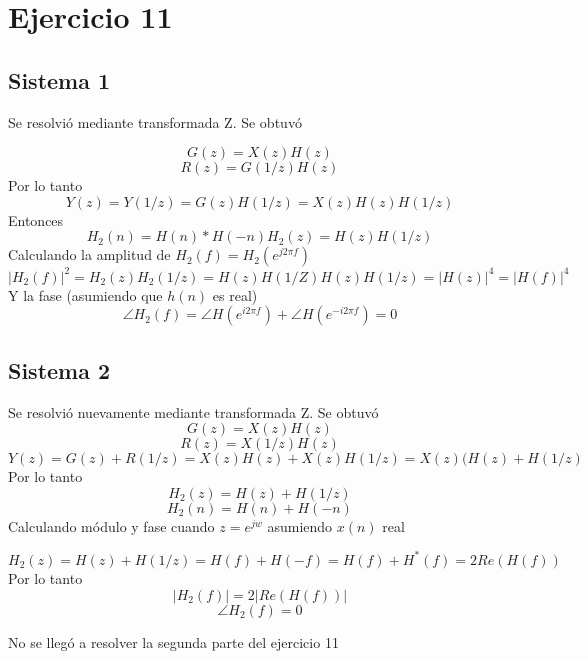 \documentclass[assd_guia_filtros_recursivos_main.tex]{subfiles}
\begin{document}
\section{Ejercicio 11}

\subsection{Sistema 1}

Se resolvió mediante transformada Z. Se obtuvó

\begin{equation}
G(z)=X(z)H(z)
\end{equation}
\begin{equation}
R(z)=G(1/z)H(z)
\end{equation}
Por lo tanto
\begin{equation}
Y(z)=Y(1/z)=G(z)H(1/z)=X(z)H(z)H(1/z)
\end{equation}
Entonces
\begin{equation}
H_2(n)=H(n)*H(-n)
H_2(z)=H(z)H(1/z)
\end{equation}
Calculando la amplitud de $H_2(f)=H_2(e^{j2\pi f})$
\begin{equation}
|H_2(f)|^2=H_2(z)H_2(1/z)=H(z)H(1/Z)H(z)H(1/z)=|H(z)|^4=|H(f)|^4
\end{equation}
Y la fase (asumiendo que $h(n)$ es real)
\begin{equation}
\angle H_2(f)= \angle H(e^{i2\pi f}) + \angle H(e^{-i2\pi f}) = 0
\end{equation}

\subsection{Sistema 2}

Se resolvió nuevamente mediante transformada Z. Se obtuvó
\begin{equation}
G(z)=X(z)H(z)
\end{equation}
\begin{equation}
R(z)=X(1/z)H(z)
\end{equation}
\begin{equation}
Y(z)=G(z)+R(1/z)=X(z)H(z)+X(z)H(1/z)=X(z)( H(z) + H(1/z)
\end{equation}
Por lo tanto
\begin{equation}
H_2(z)=H(z)+H(1/z)
\end{equation}
\begin{equation}
H_2(n)=H(n)+H(-n)
\end{equation}
Calculando módulo y fase cuando $z=e^{jw}$ asumiendo $x(n)$ real

\begin{equation}
H_2(z)=H(z)+H(1/z)=H(f)+H(-f)=H(f)+H^{*}(f)=2Re(H(f))
\end{equation}
Por lo tanto
\begin{equation}
|H_2(f)|=2|Re(H(f))|
\end{equation}
\begin{equation}
\angle H_2(f)=0
\end{equation}

No se llegó a resolver la segunda parte del ejercicio 11
\end{document}
